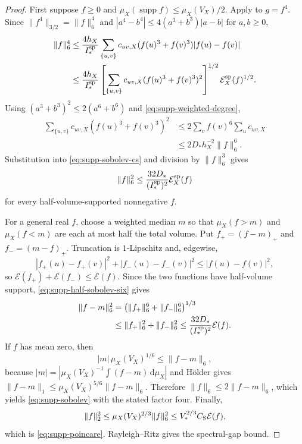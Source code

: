 \documentclass[11pt]{article}
\theoremstyle{definition}
\theoremstyle{remark}
\newcommand{\dd}{\mathrm d}
\newcommand{\supp}{\operatorname{supp}}
\begin{document}
\begin{proof}
First suppose $f\ge0$ and $\mu_X(\supp f)\le\mu_X(V_X)/2$.  Apply
 to $g=f^4$.  Since
$\|f^4\|_{3/2}=\|f\|_6^4$ and
$|a^4-b^4|\le4(a^3+b^3)|a-b|$ for $a,b\ge0$,
\begin{align}
 \|f\|_6^4
 &\le \frac{4h_X}{I_*^{\rm sp}}
 \sum_{\{u,v\}}c_{uv,X}(f(u)^3+f(v)^3)|f(u)-f(v)| \\
 &\le \frac{4h_X}{I_*^{\rm sp}}
 \left[\sum_{\{u,v\}}c_{uv,X}(f(u)^3+f(v)^3)^2\right]^{1/2}
 \mathcal E_X^{\rm sp}(f)^{1/2}.
 \label{eq:supp-sobolev-cs}
\end{align}
Using $(a^3+b^3)^2\le2(a^6+b^6)$ and
\eqref{eq:supp-weighted-degree},
\begin{align}
 \sum_{\{u,v\}}c_{uv,X}(f(u)^3+f(v)^3)^2
 &\le2\sum_v f(v)^6\sum_uc_{uv,X} \\
 &\le2D_*h_X^{-2}\|f\|_6^6.
 \label{eq:supp-degree-six}
\end{align}
Substitution into \eqref{eq:supp-sobolev-cs} and division by
$\|f\|_6^3$ gives
\begin{equation}
 \|f\|_6^2
 \le \frac{32D_*}{(I_*^{\rm sp})^2}\mathcal E_X^{\rm sp}(f)
 \label{eq:supp-half-sobolev-six}
\end{equation}
for every half-volume-supported nonnegative $f$.

For a general real $f$, choose a weighted median $m$ so that
$\mu_X(f>m)$ and $\mu_X(f<m)$ are each at most half the total volume.  Put
$f_+=(f-m)_+$ and $f_-=(m-f)_+$.  Truncation is $1$-Lipschitz and, edgewise,
\begin{equation}
 |f_+(u)-f_+(v)|^2+|f_-(u)-f_-(v)|^2
 \le |f(u)-f(v)|^2,
 \label{eq:supp-truncation-energy}
\end{equation}
so
$\mathcal E(f_+)+\mathcal E(f_-)\le\mathcal E(f)$.  Since the two functions
have half-volume support, \eqref{eq:supp-half-sobolev-six} gives
\begin{align}
 \|f-m\|_6^2
 &=\bigl(\|f_+\|_6^6+\|f_-\|_6^6\bigr)^{1/3} \\
 &\le \|f_+\|_6^2+\|f_-\|_6^2
 \le \frac{32D_*}{(I_*^{\rm sp})^2}\mathcal E(f).
 \label{eq:supp-median-six}
\end{align}
If $f$ has mean zero, then
\begin{equation}
 |m|\,\mu_X(V_X)^{1/6}
 \le \|f-m\|_6,
 \label{eq:supp-median-mean}
\end{equation}
because
$|m|=|\mu_X(V_X)^{-1}\int(f-m)\,\dd\mu_X|$ and H\"older gives
$\|f-m\|_1\le\mu_X(V_X)^{5/6}\|f-m\|_6$.  Therefore
$\|f\|_6\le2\|f-m\|_6$, which yields \eqref{eq:supp-sobolev} with the
stated factor four.  Finally,
\begin{equation}
 \|f\|_2^2\le\mu_X(V_X)^{2/3}\|f\|_6^2
 \le V_*^{2/3}C_{\rm S}\mathcal E(f),
\end{equation}
which is \eqref{eq:supp-poincare}.  Rayleigh--Ritz gives the spectral-gap
bound.
\end{proof}
\end{document}
